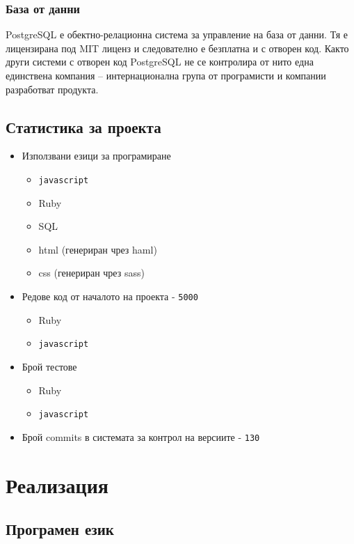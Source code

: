 \documentclass[a4paper]{article}
\def\js{\texttt{javascript}}
\begin{document}
  \subsubsection{База от данни}
  PostgreSQL \cite{postgresql} е обектно-релационна система за управление на база от данни. Тя е лицензирана под MIT лиценз и следователно е безплатна и с отворен код. Както други системи с отворен код PostgreSQL не се контролира от нито една единствена компания -- интернационална група от програмисти и компании разработват продукта.

  \subsection{Статистика за проекта}
  \begin{itemize}
    \item Използвани езици за програмиране
    \begin{itemize}
      \item \js
      \item Ruby
      \item SQL
      \item html (генериран чрез haml)
      \item css (генериран чрез sass)
    \end{itemize}
    
    \item Редове код от началото на проекта - \texttt{5000}
    \begin{itemize}
      \item Ruby 
      \item \js {}
    \end{itemize}

    \item Брой тестове
    \begin{itemize}
      \item Ruby 
      \item \js {}
    \end{itemize}

    \item Брой commits в системата за контрол на версиите - \texttt{130}
  \end{itemize}

\section{Реализация}

\subsection{Програмен език}
\end{document}
